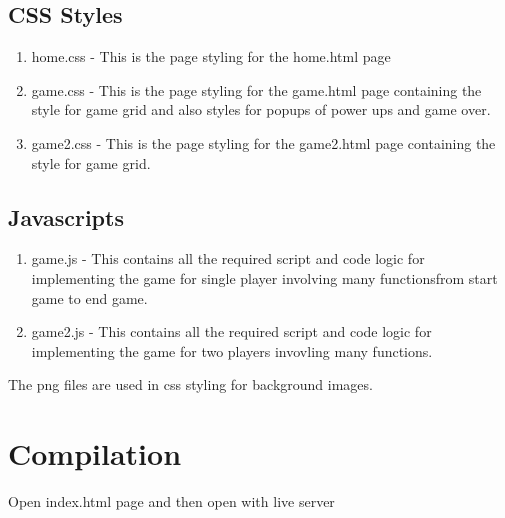 \documentclass[12pt]{article}
\begin{document}
\subsection{CSS Styles}
\begin{enumerate}
    \item home.css - This is the page styling for the home.html page
    \item game.css - This is the page styling for the game.html page containing the style for game grid and also styles for popups of power ups and game over.
    \item game2.css - This is the page styling for the game2.html page containing the style for game grid.
\end{enumerate}

\subsection{Javascripts}
\begin{enumerate}
    \item game.js - This contains all the required script and code logic for implementing the game for single player involving many functionsfrom start game to end game.
    \item game2.js - This contains all the required script and code logic for implementing the game for two players invovling many functions.
\end{enumerate}

The png files are used in css styling for background images.

\section{Compilation}
Open index.html page and then open with live server

\nocite{*}
\printbibliography
\end{document}
